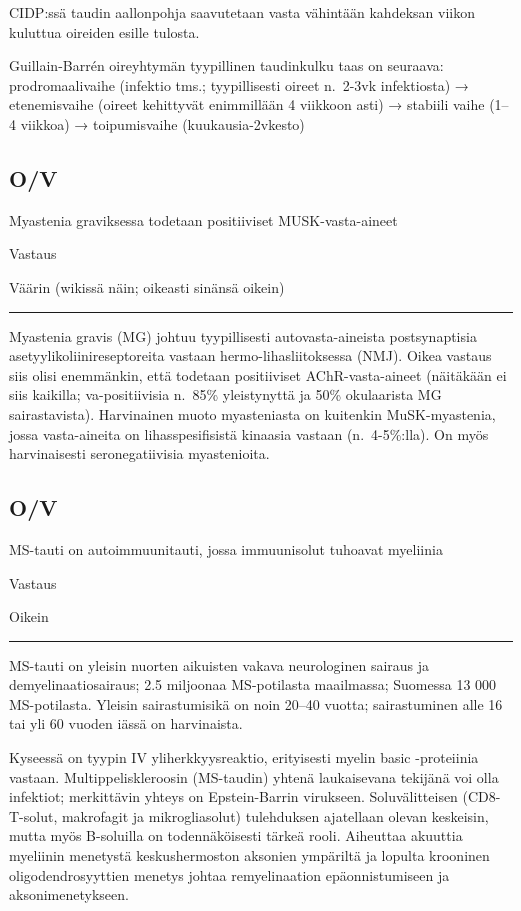 \documentclass[
]{book}
\begin{document}
CIDP:ssä taudin aallonpohja saavutetaan vasta vähintään kahdeksan viikon kuluttua oireiden esille tulosta.

Guillain-Barrén oireyhtymän tyypillinen taudinkulku taas on seuraava: prodromaalivaihe (infektio tms.; tyypillisesti oireet n.~2-3vk infektiosta) → etenemisvaihe (oireet kehittyvät enimmillään 4 viikkoon asti) → stabiili vaihe (1--4 viikkoa) → toipumisvaihe (kuukausia-2vkesto)

\subsection{O/V}\label{ov-36}

Myastenia graviksessa todetaan positiiviset MUSK-vasta-aineet

Vastaus

Väärin (wikissä näin; oikeasti sinänsä oikein)

\begin{center}\rule{0.5\linewidth}{0.5pt}\end{center}

Myastenia gravis (MG) johtuu tyypillisesti autovasta-aineista postsynaptisia asetyylikoliinireseptoreita vastaan hermo-lihasliitoksessa (NMJ). Oikea vastaus siis olisi enemmänkin, että todetaan positiiviset AChR-vasta-aineet (näitäkään ei siis kaikilla; va-positiivisia n.~85\% yleistynyttä ja 50\% okulaarista MG sairastavista). Harvinainen muoto myasteniasta on kuitenkin MuSK-myastenia, jossa vasta-aineita on lihasspesifisistä kinaasia vastaan (n.~4-5\%:lla). On myös harvinaisesti seronegatiivisia myastenioita.

\subsection{O/V}\label{ov-37}

MS-tauti on autoimmuunitauti, jossa immuunisolut tuhoavat myeliinia

Vastaus

Oikein

\begin{center}\rule{0.5\linewidth}{0.5pt}\end{center}

MS-tauti on yleisin nuorten aikuisten vakava neurologinen sairaus ja demyelinaatiosairaus; 2.5 miljoonaa MS-potilasta maailmassa; Suomessa 13 000 MS-potilasta. Yleisin sairastumisikä on noin 20--40 vuotta; sairastuminen alle 16 tai yli 60 vuoden iässä on harvinaista.

Kyseessä on tyypin IV yliherkkyysreaktio, erityisesti myelin basic -proteiinia vastaan. Multippeliskleroosin (MS-taudin) yhtenä laukaisevana tekijänä voi olla infektiot; merkittävin yhteys on Epstein-Barrin virukseen. Soluvälitteisen (CD8-T-solut, makrofagit ja mikrogliasolut) tulehduksen ajatellaan olevan keskeisin, mutta myös B-soluilla on todennäköisesti tärkeä rooli. Aiheuttaa akuuttia myeliinin menetystä keskushermoston aksonien ympäriltä ja lopulta krooninen oligodendrosyyttien menetys johtaa remyelinaation epäonnistumiseen ja aksonimenetykseen.
\end{document}
